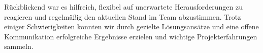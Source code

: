 \documentclass[12pt]{report}
\begin{document}
Rückblickend war es hilfreich, flexibel auf unerwartete Herausforderungen zu reagieren und regelmäßig den aktuellen Stand im Team abzustimmen. Trotz einiger Schwierigkeiten konnten wir durch gezielte Lösungsansätze und eine offene Kommunikation erfolgreiche Ergebnisse erzielen und wichtige Projekterfahrungen sammeln.

\newpage
{}
\setcounter{page}{\value{frontmatterPage}} %
\addtocounter{page}{1}

\renewcommand{\refname}{Literaturverzeichnis}


\end{document}
